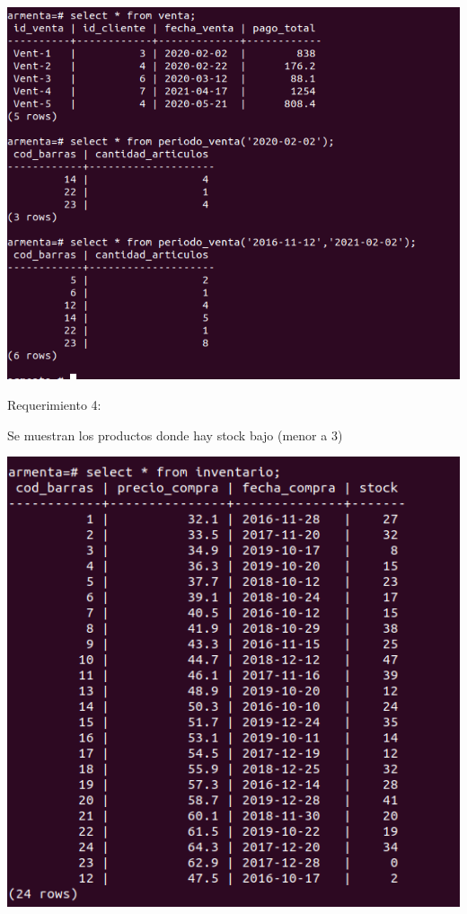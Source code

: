 \documentclass[12pt, letterpaper]{article}     %
\begin{document}
			\begin{center}
 		  	\includegraphics[scale=0.5]{3_periodo_venta_simple}
			\end{center}
				
		
				\vspace{5mm} %

		Requerimiento 4:
		
		Se muestran los productos donde hay stock bajo (menor a 3)		
		
		\begin{center}
 	  	\includegraphics[scale=0.5]{4_inventario_prod_escasos}
		\end{center}
		
\end{document}
